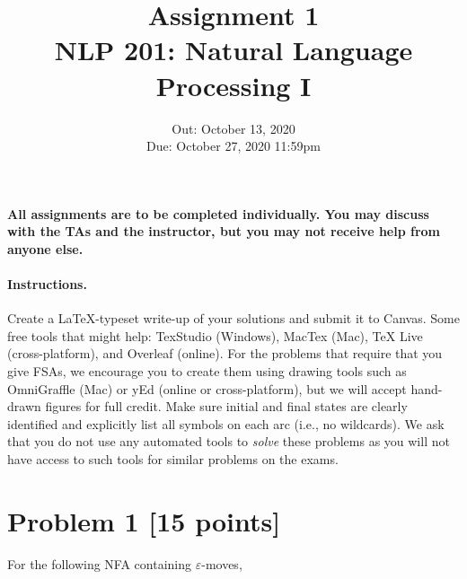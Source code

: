 \documentclass[11pt]{article}
\begin{document}
\title{Assignment 1 \\ NLP 201:  Natural Language Processing I}

\author{}

\date{Out: October 13, 2020\\
      Due: October 27, 2020 11:59pm}
\maketitle

\textbf{All assignments are to be completed individually. You may discuss with the TAs and the instructor, but you may not receive help from anyone else.}

\paragraph{Instructions.} Create a \LaTeX-typeset write-up of your solutions and submit it to Canvas. Some free tools that might help: TexStudio (Windows), MacTex (Mac), TeX Live (cross-platform), and Overleaf (online). For the problems that require that you give FSAs, we encourage you to create them using drawing tools such as OmniGraffle (Mac) or yEd (online or cross-platform), but we will accept hand-drawn figures for full credit. Make sure initial and final states are clearly identified and explicitly list all symbols on each arc (i.e., no wildcards). We ask that you do not use any automated tools to \emph{solve} these problems as you will not have access to such tools for similar problems on the exams.


\section*{Problem 1 [15 points]}
For the following NFA containing $\varepsilon$-moves,

\end{document}
